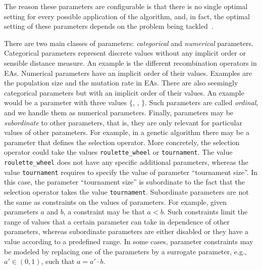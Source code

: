 \documentclass[article,a4paper,nojss,notitle]{jss}
\newcommand{\eg}{e.g.}%
\begin{document}
The reason these parameters are configurable is that there is no 
single optimal setting for every possible application of the algorithm,
and, in fact, the optimal setting of these parameters depends on the
problem being tackled~\citep{AdeLag06tuning,Birattari09tuning}.

There are two main classes of parameters: \emph{categorical} and
\emph{numerical} parameters. Categorical parameters represent discrete
values without any implicit order or sensible distance measure. An
example is the different recombination operators in EAs.  Numerical
parameters have an implicit order of their values. Examples are the
population size and the mutation rate in EAs. There are also seemingly
categorical parameters but with an implicit order %
of their values. An example would be a parameter with three values
$\{$, , $\}$. Such parameters are
called \emph{ordinal}, and we handle them as numerical
parameters. Finally, parameters may be \emph{subordinate} to other
parameters, that is, they are only relevant for particular values of
other parameters. For example, in a genetic algorithm there may be a
parameter that defines the selection operator. %
More concretely, the selection operator
could take the values \texttt{roulette\_wheel} or \texttt{tournament}. The value \texttt{roulette\_wheel}  does not have
any specific additional parameters, whereas the value \texttt{tournament}  requires to
specify the value of parameter ``tournament size''. In this case, the parameter ``tournament size'' is subordinate to the fact that the selection operator takes the value \texttt{tournament}.
Subordinate parameters are not the same as
constraints on the values of parameters.  For example, given
parameters $a$ and $b$, a constraint may be that $a < b$. Such
constraints limit the range of values that a certain parameter can
take in dependence of other parameters, whereas subordinate parameters
are either disabled or they have a value according to a predefined
range. In some cases, parameter constraints may be modeled by
replacing one of the parameters by a surrogate parameter, \eg{}, $a'
\in (0,1)$, such that $ a = a' \cdot b$.
\end{document}
